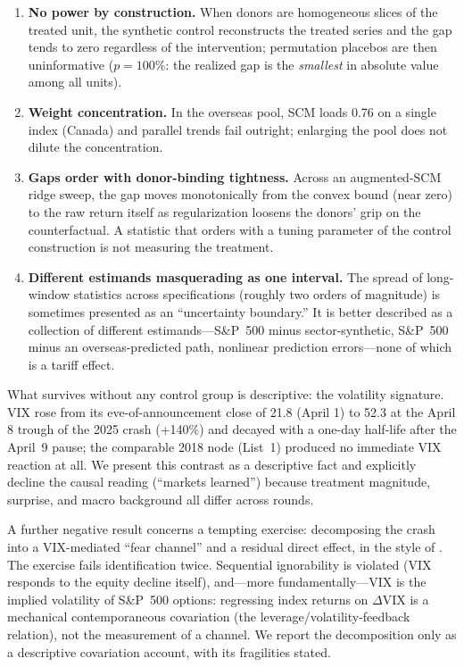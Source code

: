 \documentclass[11pt,a4paper]{article}
\begin{document}
\begin{enumerate}
  \item \textbf{No power by construction.} When donors are homogeneous
  slices of the treated unit, the synthetic control reconstructs the
  treated series and the gap tends to zero regardless of the intervention;
  permutation placebos are then uninformative ($p=100\%$: the realized gap
  is the \emph{smallest} in absolute value among all units).
  \item \textbf{Weight concentration.} In the overseas pool, SCM loads
  0.76 on a single index (Canada) and parallel trends fail outright;
  enlarging the pool does not dilute the concentration.
  \item \textbf{Gaps order with donor-binding tightness.} Across an
  augmented-SCM ridge sweep, the gap moves monotonically from the convex
  bound (near zero) to the raw return itself as regularization loosens the
  donors' grip on the counterfactual. A statistic that orders with a
  tuning parameter of the control construction is not measuring the
  treatment.
  \item \textbf{Different estimands masquerading as one interval.} The
  spread of long-window statistics across specifications (roughly two
  orders of magnitude) is sometimes presented as an ``uncertainty
  boundary.'' It is better described as a collection of different
  estimands---S\&P~500 minus sector-synthetic, S\&P~500 minus an
  overseas-predicted path, nonlinear prediction errors---none of which is a
  tariff effect.
\end{enumerate}

What survives without any control group is descriptive: the volatility
signature. VIX rose from its eve-of-announcement close of 21.8 (April 1)
to 52.3 at the April 8 trough of the 2025
crash (+140\%) and decayed with a one-day half-life after the April~9
pause; the comparable 2018 node (List~1) produced no immediate VIX
reaction at all. We present this contrast as a descriptive fact and
explicitly decline the causal reading (``markets learned'') because
treatment magnitude, surprise, and macro background all differ across
rounds.

A further negative result concerns a tempting exercise: decomposing the
crash into a VIX-mediated ``fear channel'' and a residual direct effect, in
the style of \citet{imai2010}. The exercise fails identification twice.
Sequential ignorability is violated (VIX responds to the equity decline
itself), and---more fundamentally---VIX is the implied volatility of
S\&P~500 options: regressing index returns on $\Delta$VIX is a mechanical
contemporaneous covariation (the leverage/volatility-feedback relation),
not the measurement of a channel. We report the decomposition only as a
descriptive covariation account, with its fragilities stated.
\end{document}
